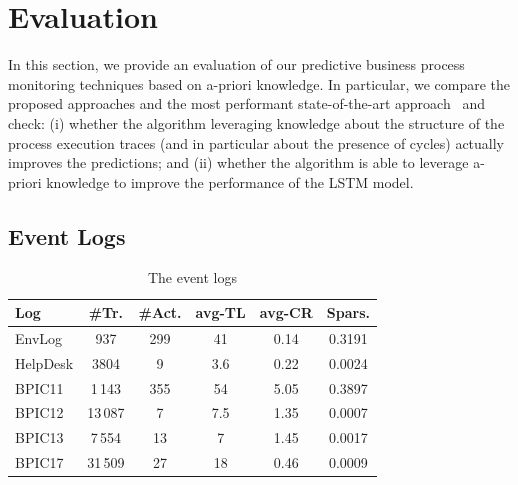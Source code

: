 
\section{Evaluation} %
\label{sec:evaluation}

In this section, we provide an evaluation of our predictive business process monitoring techniques based on a-priori knowledge. In particular, we compare the proposed approaches and the most performant state-of-the-art approach~\cite{niek96732} and check: (i) whether the \nocycle algorithm leveraging knowledge about the structure of the process execution traces (and in particular about the presence of cycles) actually improves the predictions; and (ii) whether the \protrack algorithm is able to leverage a-priori knowledge to improve the performance of the LSTM model.

\subsection{Event Logs}
\label{ssec:datasets}

\begin{table}[t]
	\centering
	 \begin{scriptsize}
	\begin{tabular}{l|c|c|c|c|c}
		\toprule
		\textbf{Log} &\textbf{\#Tr.}  & \textbf{\#Act.}  & \textbf{avg-TL} & \textbf{avg-CR}  & \textbf{Spars.}\\
		\midrule
		EnvLog      & 937    & 299   & 41      & 0.14 & 0.3191 \\
		HelpDesk    & 3804   & 9     & 3.6       & 0.22 & 0.0024 \\
		BPIC11       & 1\,143    & 355   & 54       & 5.05 & 0.3897 \\
		BPIC12       & 13\,087   & 7     & 7.5     & 1.35 & 0.0007 \\
		BPIC13       & 7\,554   & 13    & 7       & 1.45 & 0.0017 \\
		BPIC17       & 31\,509  & 27    & 18     & 0.46 & 0.0009 \\
		\bottomrule
	\end{tabular}
	\end{scriptsize}
	\caption{The event logs}
	\label{table:dataset}
\end{table}

